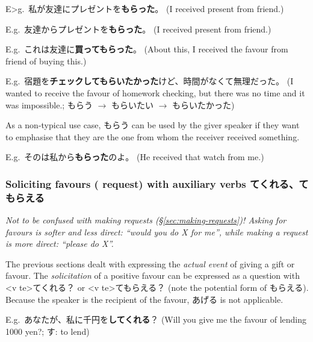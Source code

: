 \documentclass[../nihongo-gakushuu-kyouzai.tex]{subfiles}
\begin{document}


E>g.\ 私が友達にプレゼントを\textbf{もらった}。 (I received present from friend.)

E.g.\ 友達からプレゼントを\textbf{もらった}。 (I received present from friend.)

E.g.\ これは友達に\textbf{買ってもらった}。 (About this, I received the favour from friend of buying this.)

E.g.\ 宿題を\textbf{チェックしてもらいたかった}けど、時間がなくて無理だった。 (I wanted to receive the favour of homework checking, but there was no time and it was impossible.; もらう $\to$ もらいたい $\to$ もらいたかった)

As a non-typical use case, もらう can be used by the giver speaker if they want to emphasise that they are the one from whom the receiver received something.

E.g.\ そのは私から\textbf{もらった}のよ。 (He received that watch from me.)

\subsubsection{Soliciting favours (\neq{} request) with auxiliary verbs てくれる、てもらえる} \label{sec:soliciting-favours-kureru-moraeru}
\emph{Not to be confused with making requests (\S\ref{sec:making-requests})! Asking for favours is softer and less direct: ``would you do X for me'', while making a request is more direct: ``please do X''.}

The previous sections dealt with expressing the \emph{actual event} of giving a gift or favour. The \emph{solicitation} of a positive favour can be expressed as a question with <v te>てくれる？ or <v te>てもらえる？ (note the potential form of もらえる). Because the speaker is the recipient of the favour, あげる is not applicable.


E.g.\ あなたが、私に千円を\textbf{してくれる}？ (Will you give me the favour of lending 1000 yen?; す: to lend)
\end{document}
